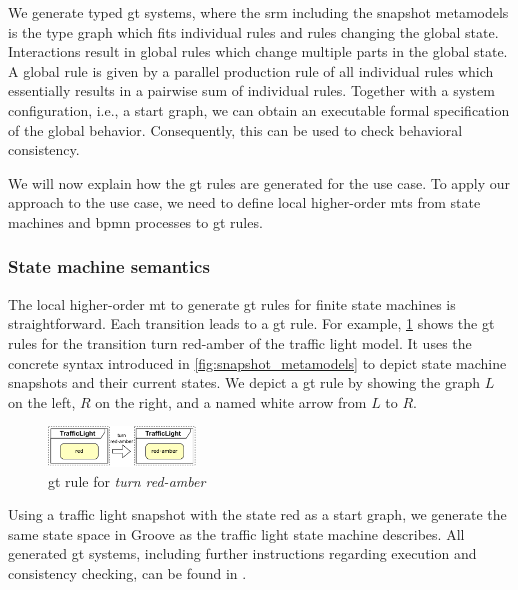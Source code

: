 \documentclass{jot}
\begin{document}
We generate typed \gls*{gt} systems, where the \gls*{srm} including the snapshot metamodels is the type graph which fits individual rules and rules changing the global state.
Interactions result in global rules which change multiple parts in the global state.
A global rule is given by a parallel production rule \cite[Definition 3.2.7]{baldanConcurrentSemanticsAlgebraic1999} of all individual rules which essentially results in a pairwise sum of individual rules.
Together with a system configuration, i.e., a start graph, we can obtain an executable formal specification of the global behavior.
Consequently, this can be used to check behavioral consistency.

We will now explain how the \gls*{gt} rules are generated for the use case.
To apply our approach to the use case, we need to define local higher-order \gls*{mt}s from state machines and \gls*{bpmn} processes to \gls*{gt} rules.


\subsubsection{State machine semantics}
The local higher-order \gls*{mt} to generate \gls*{gt} rules for finite state machines is straightforward.
Each transition leads to a \gls*{gt} rule.
For example, \cref{fig:sm_rule} shows the \gls*{gt} rules for the transition \textsf{turn red-amber} of the traffic light model.
It uses the concrete syntax introduced in \cref{fig:snapshot_metamodels} to depict state machine snapshots and their current states.
We depict a \gls*{gt} rule by showing the graph $L$ on the left, $R$ on the right, and a named white arrow from $L$ to $R$.

\begin{figure}[h]
    \centering
    \includegraphics[width=0.35\textwidth]{figures/sm_rule.pdf}
    \caption{\gls*{gt} rule for \emph{turn red-amber}}
    \label{fig:sm_rule}
\end{figure}

Using a traffic light snapshot with the state red as a start graph, we generate the same state space in Groove as the traffic light state machine describes.
All generated \gls*{gt} systems, including further instructions regarding execution and consistency checking, can be found in \cite{krauterArtifactsBehavioralConsistency2022}.
\end{document}
